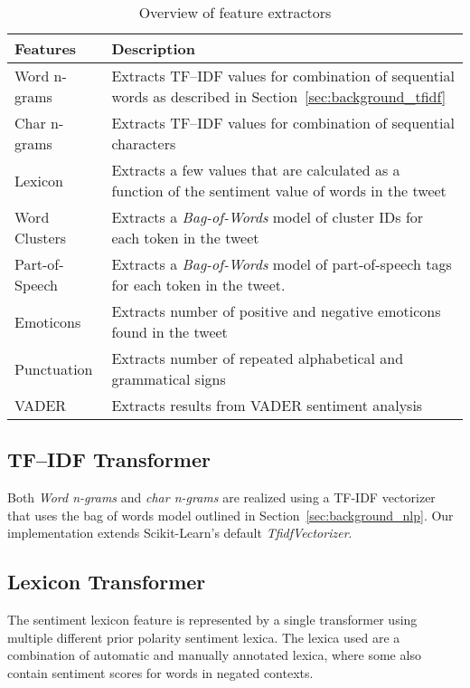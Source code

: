 \noindent\begin{table}[ht]
    \begin{tabular}{| l | p{10cm} |}
        \hline
        \textbf{Features} & \textbf{Description} \\ \hline
        Word n-grams & Extracts TF--IDF values for combination of sequential words as described in Section~\ref{sec:background_tfidf} \\ \hline
        Char n-grams & Extracts TF--IDF values for combination of sequential characters \\ \hline
        Lexicon & Extracts a few values that are calculated as a function of the sentiment value of words in the tweet \\ \hline
        Word Clusters & Extracts a \textit{Bag-of-Words} model of cluster IDs for each token in the tweet \\ \hline
        Part-of-Speech & Extracts a \textit{Bag-of-Words} model of part-of-speech tags  for each token in the tweet. \\ \hline
        Emoticons & Extracts number of positive and negative emoticons found in the tweet \\ \hline
        Punctuation & Extracts number of repeated alphabetical and grammatical signs \\ \hline
        VADER & Extracts results from VADER sentiment analysis \\ \hline
    \end{tabular}
    \caption{Overview of feature extractors}
    \label{tab:feature_extractors}
\end{table}


\subsection*{TF--IDF Transformer}
Both \textit{Word n-grams} and \textit{char n-grams} are realized using a TF-IDF vectorizer that uses the bag of words model outlined in Section~\ref{sec:background_nlp}. Our implementation extends Scikit-Learn's default \textit{TfidfVectorizer}.


\subsection*{Lexicon Transformer}
The sentiment lexicon feature is represented by a single transformer using multiple different prior polarity sentiment lexica. The lexica used are a combination of automatic and manually annotated lexica, where some also contain sentiment scores for words in negated contexts. \\

